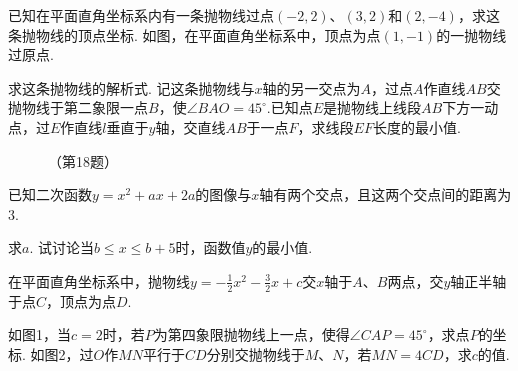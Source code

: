 \documentclass[10pt]{article}
\begin{document}
\begin{questions}{\answeringintroduction}
    \question 已知在平面直角坐标系内有一条抛物线过点$(-2,2)$、$(3,2)$和$(2,-4)$，求这条抛物线的顶点坐标.
    \question 如图，在平面直角坐标系中，顶点为点$(1,-1)$的一抛物线过原点.
    \begin{subquestions}
        \subquestion 求这条抛物线的解析式.
        \subquestion 记这条抛物线与$x$轴的另一交点为$A$，过点$A$作直线$AB$交抛物线于第二象限一点$B$，使$\angle BAO=45^{\circ}$.已知点$E$是抛物线上线段$AB$下方一动点，过$E$作直线$l$垂直于$y$轴，交直线$AB$于一点$F$，求线段$EF$长度的最小值.
    \end{subquestions}
    \begin{figure}[!htb]
        \centering
        \caption*{（第18题）}
    \end{figure}
    \question 已知二次函数$y=x^2+ax+2a$的图像与$x$轴有两个交点，且这两个交点间的距离为$3$.
    \begin{subquestions}
        \subquestion 求$a$.
        \subquestion 试讨论当$b \le x \le b+5$时，函数值$y$的最小值.
    \end{subquestions}
    \begin{subquestions}
    \end{subquestions}
    \question 在平面直角坐标系中，抛物线$y = - \frac{1}{2}x^{2} - \frac{3}{2}x + c$交$x$轴于$A$、$B$两点，交$y$轴正半轴于点$C$，顶点为点$D$.
    \begin{subquestions}
        \subquestion 如图1，当$c = 2$时，若$P$为第四象限抛物线上一点，使得$\angle CAP = 45^{\circ}$，求点$P$的坐标.
        \subquestion 如图2，过$O$作$MN$平行于$CD$分别交抛物线于$M$、$N$，若$MN = 4CD$，求$c$的值.
    \end{subquestions}

\end{questions}
\end{document}
